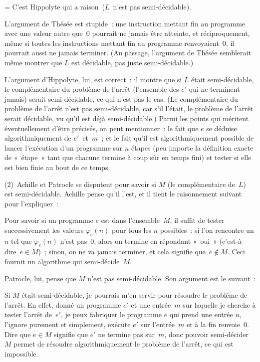 \documentclass[12pt,a4paper]{article}
\theoremstyle{definition}
\newif\ifcorrige
\newenvironment{corrige}%
{\ifcorrige\relax\else\setbox0=\vbox\bgroup\fi%
\smallbreak\footnotesize\noindent{\underbar{\textit{Corrigé.}}\quad}}
{{\hbox{}\nobreak\hfill\checkmark}%
\ifcorrige\relax\else\egroup\fi\par}
\begin{document}
\begin{corrige}
C'est Hippolyte qui a raison ($L$ n'est pas semi-décidable).

L'argument de Thésée est stupide : une instruction mettant fin au
programme avec une valeur autre que $0$ pourrait ne jamais être
atteinte, et réciproquement, même si toutes les instructions mettant
fin au programme renvoyaient $0$, il pourrait aussi ne jamais
terminer.  (Au passage, l'argument de Thésée semblerait même montrer
que $L$ est décidable, pas juste semi-décidable.)

L'argument d'Hippolyte, lui, est correct : il montre que si $L$ était
semi-décidable, le complémentaire du problème de l'arrêt (l'ensemble
des $e'$ qui ne terminent jamais) serait semi-décidable, ce qui n'est
pas le cas.  (Le complémentaire du problème de l'arrêt n'est pas
semi-décidable, car s'il l'était, le problème de l'arrêt serait
décidable, vu qu'il est déjà semi-décidable.)  Parmi les points qui
méritent éventuellement d'être précisés, on peut mentionner : le fait
que $e$ se déduise algorithmiquement de $e'$ et $m$ ; et le fait qu'il
est algorithmiquement possible de lancer l'exécution d'un programme
sur $n$ étapes (peu importe la définition exacte de « étape » tant que
chacune termine à coup sûr en temps fini) et tester si elle est bien
finie au bout de ce temps.
\end{corrige}

\medskip

(2) Achille et Patrocle se disputent pour savoir si $M$ (le
complémentaire de $L$) est semi-décidable.  Achille pense qu'il l'est,
et il tient le raisonnement suivant pour l'expliquer :

{\narrower

Pour savoir si un programme $e$ est dans l'ensemble $M$, il suffit de
tester successivement les valeurs $\varphi_e(n)$ pour tous les $n$
possibles : si l'on rencontre un $n$ tel que $\varphi_e(n)$ n'est
pas $0$, alors on termine en répondant « oui » (c'est-à-dire $e\in
M$) ; sinon, on ne va jamais terminer, et cela signifie que $e\not\in
M$.  Ceci fournit un algorithme qui semi-décide $M$.

\par}

\smallskip

\noindent Patrocle, lui, pense que $M$ n'est pas semi-décidable.  Son
argument est le suivant :

{\narrower

Si $M$ était semi-décidable, je pourrais m'en servir pour résoudre le
problème de l'arrêt.  En effet, donné un programme $e'$ et une
entrée $m$ sur laquelle je cherche à tester l'arrêt de $e'$, je peux
fabriquer le programme $e$ qui prend une entrée $n$, l'ignore purement
et simplement, exécute $e'$ sur l'entrée $m$ et à la fin renvoie $0$.
Dire que $e\in M$ signifie que $e'$ ne termine pas sur $m$, donc
pouvoir semi-décider $M$ permet de résoudre algorithmiquement le
problème de l'arrêt, ce qui est impossible.

\par}
\end{document}
